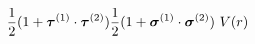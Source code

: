 \begin{equation}
\frac{1}{2} (1 + \mbox{\boldmath $\tau$}^{(1)} \cdot \mbox{\boldmath $\tau$}^{(2)}) 
\frac{1}{2} (1 + \mbox{\boldmath $\sigma$}^{(1)} \cdot \mbox{\boldmath $\sigma$}^{(2)})~V(r)
\end{equation}

